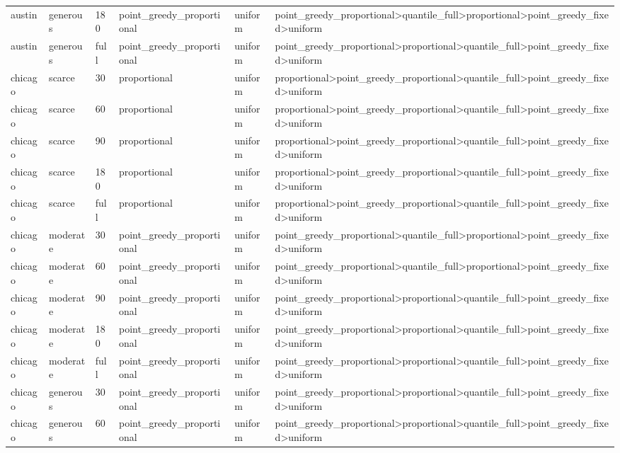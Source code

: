 \begin{tabular}{llllll}
austin & generous & 180 & point\_greedy\_proportional & uniform & point\_greedy\_proportional>quantile\_full>proportional>point\_greedy\_fixed>uniform \\
austin & generous & full & point\_greedy\_proportional & uniform & point\_greedy\_proportional>proportional>quantile\_full>point\_greedy\_fixed>uniform \\
chicago & scarce & 30 & proportional & uniform & proportional>point\_greedy\_proportional>quantile\_full>point\_greedy\_fixed>uniform \\
chicago & scarce & 60 & proportional & uniform & proportional>point\_greedy\_proportional>quantile\_full>point\_greedy\_fixed>uniform \\
chicago & scarce & 90 & proportional & uniform & proportional>point\_greedy\_proportional>quantile\_full>point\_greedy\_fixed>uniform \\
chicago & scarce & 180 & proportional & uniform & proportional>point\_greedy\_proportional>quantile\_full>point\_greedy\_fixed>uniform \\
chicago & scarce & full & proportional & uniform & proportional>point\_greedy\_proportional>quantile\_full>point\_greedy\_fixed>uniform \\
chicago & moderate & 30 & point\_greedy\_proportional & uniform & point\_greedy\_proportional>quantile\_full>proportional>point\_greedy\_fixed>uniform \\
chicago & moderate & 60 & point\_greedy\_proportional & uniform & point\_greedy\_proportional>quantile\_full>proportional>point\_greedy\_fixed>uniform \\
chicago & moderate & 90 & point\_greedy\_proportional & uniform & point\_greedy\_proportional>proportional>quantile\_full>point\_greedy\_fixed>uniform \\
chicago & moderate & 180 & point\_greedy\_proportional & uniform & point\_greedy\_proportional>proportional>quantile\_full>point\_greedy\_fixed>uniform \\
chicago & moderate & full & point\_greedy\_proportional & uniform & point\_greedy\_proportional>proportional>quantile\_full>point\_greedy\_fixed>uniform \\
chicago & generous & 30 & point\_greedy\_proportional & uniform & point\_greedy\_proportional>proportional>quantile\_full>point\_greedy\_fixed>uniform \\
chicago & generous & 60 & point\_greedy\_proportional & uniform & point\_greedy\_proportional>proportional>quantile\_full>point\_greedy\_fixed>uniform \\

\end{tabular}
